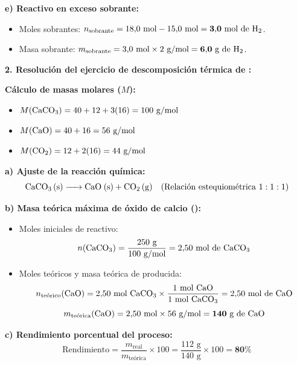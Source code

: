 ﻿\documentclass[11pt,a4paper]{article}
\begin{document}
\vspace{0.1cm}
\noindent\textbf{e) Reactivo en exceso sobrante:}
\begin{itemize}[leftmargin=1.5em, itemsep=2pt]
    \item Moles sobrantes: $n_{\text{sobrante}} = 18{,}0\text{ mol} - 15{,}0\text{ mol} = \mathbf{3{,}0\text{ mol de \ce{H2}}}$.
    \item Masa sobrante: $m_{\text{sobrante}} = 3{,}0\text{ mol} \times 2\text{ g/mol} = \mathbf{6{,}0\text{ g de \ce{H2}}}$.
\end{itemize}

\newpage

\noindent\textbf{2. Resolución del ejercicio de descomposición térmica de :}

\vspace{0.2cm}
\noindent\textbf{Cálculo de masas molares ($M$):}
\begin{itemize}[leftmargin=1.5em, itemsep=2pt]
    \item $M(\ce{CaCO3}) = 40 + 12 + 3(16) = 100\text{ g/mol}$
    \item $M(\ce{CaO}) = 40 + 16 = 56\text{ g/mol}$
    \item $M(\ce{CO2}) = 12 + 2(16) = 44\text{ g/mol}$
\end{itemize}

\vspace{0.15cm}
\noindent\textbf{a) Ajuste de la reacción química:}
\[
\ce{CaCO3 (s) -> CaO (s) + CO2 (g)} \quad (\text{Relación estequiométrica } 1:1:1)
\]

\vspace{0.1cm}
\noindent\textbf{b) Masa teórica máxima de óxido de calcio ():}
\begin{itemize}[leftmargin=1.5em, itemsep=2pt]
    \item Moles iniciales de reactivo:
    \[
    n(\ce{CaCO3}) = \frac{250\text{ g}}{100\text{ g/mol}} = 2{,}50\text{ mol de \ce{CaCO3}}
    \]
    \item Moles teóricos y masa teórica de  producida:
    \[
    n_{\text{teórico}}(\ce{CaO}) = 2{,}50\text{ mol \ce{CaCO3}} \times \frac{1\text{ mol \ce{CaO}}}{1\text{ mol \ce{CaCO3}}} = 2{,}50\text{ mol de \ce{CaO}}
    \]
    \[
    m_{\text{teórica}}(\ce{CaO}) = 2{,}50\text{ mol} \times 56\text{ g/mol} = \mathbf{140\text{ g de \ce{CaO}}}
    \]
\end{itemize}

\vspace{0.1cm}
\noindent\textbf{c) Rendimiento porcentual del proceso:}
\[
\text{Rendimiento} = \frac{m_{\text{real}}}{m_{\text{teórica}}} \times 100 = \frac{112\text{ g}}{140\text{ g}} \times 100 = \mathbf{80\%}
\]
\end{document}
